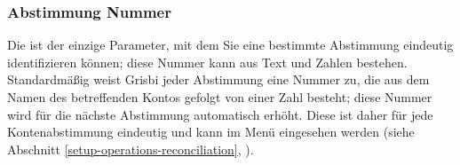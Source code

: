 \subsubsection{Abstimmung Nummer\label{reconciliation-account-description-number}}

Die  ist der einzige Parameter, mit dem Sie eine bestimmte Abstimmung eindeutig identifizieren können; diese Nummer kann aus Text und Zahlen bestehen. Standardmäßig weist Grisbi jeder Abstimmung eine Nummer zu, die aus dem Namen des betreffenden Kontos gefolgt von einer Zahl besteht; diese Nummer wird für die nächste Abstimmung automatisch erhöht. Diese  ist daher für jede Kontenabstimmung eindeutig und kann im Menü  eingesehen werden (siehe Abschnitt \vref{setup-operations-reconciliation}, ).

